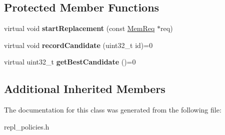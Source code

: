 \subsection*{Protected Member Functions}
\begin{DoxyCompactItemize}
\item 
\hypertarget{classLegacyReplPolicy_a65938073835253f0fba77e821c1dbef0}{virtual void {\bfseries start\-Replacement} (const \hyperlink{structMemReq}{Mem\-Req} $\ast$req)}\label{classLegacyReplPolicy_a65938073835253f0fba77e821c1dbef0}

\item 
\hypertarget{classLegacyReplPolicy_ab1249dd2c85086076d8f666628c0322e}{virtual void {\bfseries record\-Candidate} (uint32\-\_\-t id)=0}\label{classLegacyReplPolicy_ab1249dd2c85086076d8f666628c0322e}

\item 
\hypertarget{classLegacyReplPolicy_a5fe3f005b39d8bba634f293aaf486572}{virtual uint32\-\_\-t {\bfseries get\-Best\-Candidate} ()=0}\label{classLegacyReplPolicy_a5fe3f005b39d8bba634f293aaf486572}

\end{DoxyCompactItemize}
\subsection*{Additional Inherited Members}


The documentation for this class was generated from the following file\-:\begin{DoxyCompactItemize}
\item 
repl\-\_\-policies.\-h\end{DoxyCompactItemize}
